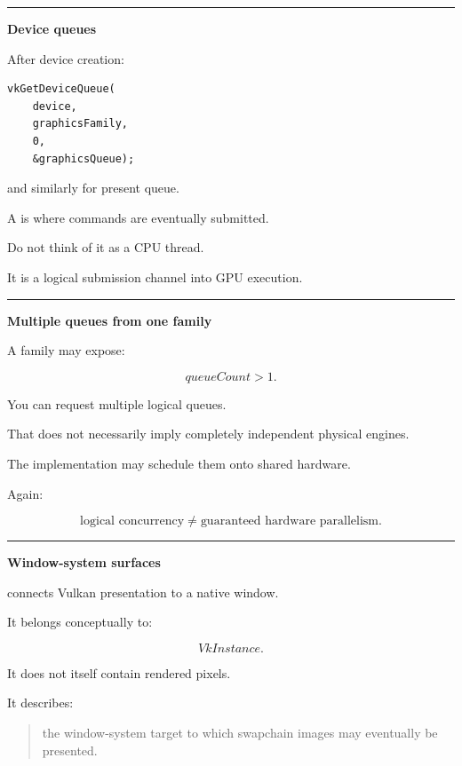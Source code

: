 \begin{center}\rule{0.5\linewidth}{0.5pt}\end{center}

\textbf{Device queues}

After device creation:

\begin{verbatim}
vkGetDeviceQueue(
    device,
    graphicsFamily,
    0,
    &graphicsQueue);
\end{verbatim}

and similarly for present queue.

A  is where commands are eventually submitted.

Do not think of it as a CPU thread.

It is a logical submission channel into GPU execution.

\begin{center}\rule{0.5\linewidth}{0.5pt}\end{center}

\textbf{Multiple queues from one family}

A family may expose:

\[
queueCount>1.
\]

You can request multiple logical queues.

That does not necessarily imply completely independent physical engines.

The implementation may schedule them onto shared hardware.

Again:

\[
\boxed{
\text{logical concurrency}
\neq
\text{guaranteed hardware parallelism}.
}
\]

\begin{center}\rule{0.5\linewidth}{0.5pt}\end{center}

\textbf{Window-system surfaces}

 connects Vulkan presentation to a native window.

It belongs conceptually to:

\[
VkInstance.
\]

It does not itself contain rendered pixels.

It describes:

\begin{quote}
the window-system target to which swapchain images may eventually be presented.
\end{quote}

